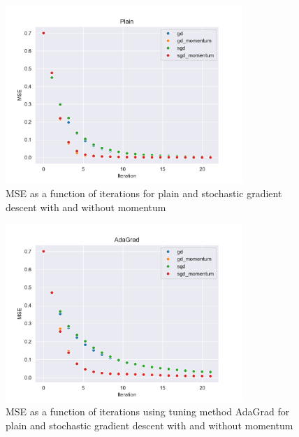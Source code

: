 \begin{figure}[H]
\centering
\includegraphics[width=0.8\textwidth]{Figures/PartA/PlainMSE(iter).pdf}
\caption{MSE as a function of iterations for plain and stochastic gradient descent with and without momentum}
\label{fig:PlainMSE-iter-pdf}
\end{figure}

\begin{figure}[H]
\centering
\includegraphics[width=0.8\textwidth]{Figures/PartA/AdaGradMSE(iter).pdf}
\caption{MSE as a function of iterations using tuning method AdaGrad for plain and stochastic gradient descent with and without momentum}
\label{fig:AdaGradMSE-iter-pdf}
\end{figure}


